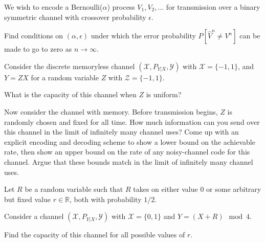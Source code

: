 \documentclass[a4paper,10pt,landscape,twocolumn]{scrartcl}
\begin{document}
\begin{exercise}
We wish to encode a Bernoulli($\alpha$) process $V_1, V_2, ...$ for transmission over a binary symmetric channel with crossover probability $\epsilon$.
\begin{center}
\end{center}
Find conditions on $(\alpha,\epsilon)$ under which the error probability $P[\hat{V}^n \neq V^n]$ can be made to go to zero as $n \to \infty$.
\end{exercise}

\begin{exercise}
Consider the discrete memoryless channel $(\mathcal{X}, P_{Y|X}, \mathcal{Y})$ with $\mathcal{X} = \{-1,1\}$, and $Y = ZX$ for a random variable $Z$ with $\mathcal{Z} = \{-1,1\}$.
\begin{subex}
What is the capacity of this channel when $Z$ is uniform?
\end{subex}
\begin{subex}
Now consider the channel with memory. Before transmission begins, $Z$ is randomly chosen and fixed for all time. How much information can you send over this channel in the limit of infinitely many channel uses? Come up with an explicit encoding and decoding scheme to show a lower bound on the achievable rate, then show an upper bound on the rate of any noisy-channel code for this channel. Argue that these bounds match in the limit of infinitely many channel uses.
\end{subex}
\end{exercise}

\begin{exercise}
Let $R$ be a random variable such that $R$ takes on either value 0 or some arbitrary but fixed value $r \in \mathbb{R}$, both with probability $1/2$.

Consider a channel $(\mathcal{X},P_{Y|X},\mathcal{Y})$ with $\mathcal{X} = \{0,1\}$ and
$Y = (X+R) \mod 4$.

Find the capacity of this channel for all possible values of $r$.
\end{exercise}
\end{document}
